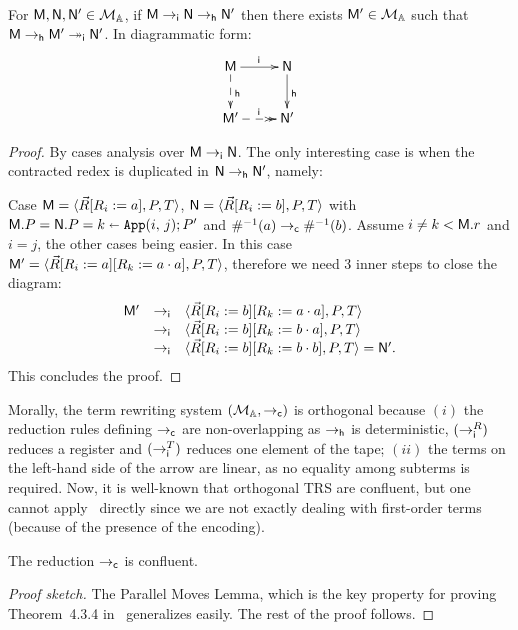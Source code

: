 \begin{lem}\label{lem:standardization}~\\ For $\mM,\mN,\mN'\in\cM$, if $\mM\red[i]\mN\red[h]\mN'$ then there exists $\mM'\in\cM$ such that $\mM\red[h]\mM'\redd[i]\mN'$. In diagrammatic form:
\[
\xymatrix{
\mM\ar@{->}[r]^{\mach{i}}\ar@{-->}[d]^{\mach{h}}&\mN\ar@{->}[d]^{\mach{h}}\\
\mM'\ar@{-->>}[r]^{\mach{i}}&\mN'
}
\]
\end{lem}

\begin{proof} By cases analysis over $\mM\red[i]\mN$.
The only interesting case is when the contracted redex is duplicated in $\mN\red[h]\mN'$, namely:

Case $\mM =\tuple{\vec R\repl{R_i}{a},P,T}$, $\mN = \tuple{\vec R\repl{R_i}{b},P,T}$ with  $\mM.P =\mN.P = \Apply ijk;P'$ and $\Lookinv a\red[c]\Lookinv b$.
Assume $i\neq k<\mM.r$ and $i = j$, the other cases being easier.
In this case $\mM' = \tuple{\vec R\repl{R_i}{a}\repl{R_k}{\App{a}{a}},P,T}$, therefore we need 3 inner steps to close the diagram:
\[
	\begin{array}{lcl}
	\mM'&\red[i]&\tuple{\vec R\repl{R_i}{b}\repl{R_k}{\App{a}{a}},P,T}\\
		&\red[i]&\tuple{\vec R\repl{R_i}{b}\repl{R_k}{\App{b}{a}},P,T}\\
			&\red[i]&\tuple{\vec R\repl{R_i}{b}\repl{R_k}{\App{b}{b}},P,T} = \mN'.
	\end{array}
\]
This concludes the proof.
\end{proof}

Morally, the term rewriting system $(\cM,\red[c])$ is orthogonal because $(i)$ the reduction rules defining $\red[c]$ are non-overlapping as $\red[h]$ is deterministic, $(\red[i]^R)$ reduces a register and $(\red[i]^T)$ reduces  one element of the tape; $(ii)$ the terms on the left-hand side of the arrow are linear, as no equality among subterms is required.
Now, it is well-known that orthogonal TRS are confluent, but one cannot apply~\cite[Thm.4.3.4]{terese} directly since we are not exactly dealing with first-order terms (because of the presence of the encoding).

\begin{prop}\label{prop:confluence}
The reduction $\red[c]$ is confluent.
\end{prop}

\begin{proof}[Proof sketch] The Parallel Moves Lemma, which is the key property for proving Theorem~4.3.4 in~\cite{terese} generalizes easily. The rest of the proof follows.
\end{proof}

